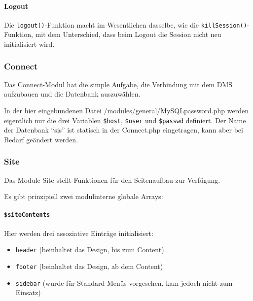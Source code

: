 \paragraph{Logout\\}
Die \texttt{logout()}-Funktion macht im Wesentlichen dasselbe, wie die \texttt{killSession()}-Funktion, mit dem Unterschied, dass beim Logout die Session nicht neu initialisiert wird.

\subsubsection{Connect}
\label{sec:content_imple_base_connect}
Das Connect-Modul hat die simple Aufgabe, die Verbindung mit dem DMS aufzubauen und die Datenbank auszuwählen.

In der hier eingebundenen Datei /modules/general/MySQLpassword.php werden eigentlich nur die drei Variablen \texttt{\$host}, \texttt{\$user} und \texttt{\$passwd} definiert. Der Name der Datenbank \enquote{sis} ist statisch in der Connect.php eingetragen, kann aber bei Bedarf geändert werden.

\subsubsection{Site}
\label{sec:content_imple_base_site}
Das Module Site stellt Funktionen für den Seitenaufbau zur Verfügung.

Es gibt prinzipiell zwei modulinterne globale Arrays:
\paragraph{\texttt{\$siteContents}\\}
Hier werden drei assoziative Einträge initialisiert: 
\begin{itemize}
	\item \texttt{header} (beinhaltet das Design, bis zum Content)
	\item \texttt{footer} (beinhaltet das Design, ab dem Content)
	\item \texttt{sidebar} (wurde für Standard-Menüs vorgesehen, kam jedoch nicht zum Einsatz)
\end{itemize}
